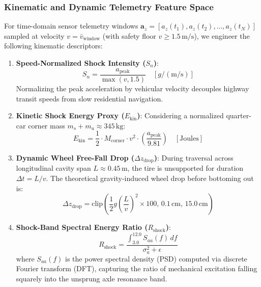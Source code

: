 \subsubsection{Kinematic and Dynamic Telemetry Feature Space}
For time-domain sensor telemetry windows $\mathbf{a}_z = [a_z(t_1), a_z(t_2), \dots, a_z(t_N)]$ sampled at velocity $v = \bar{v}_{\text{window}}$ (with safety floor $v \ge 1.5\,\text{m/s}$), we engineer the following kinematic descriptors:

\begin{enumerate}
    \item \textbf{Speed-Normalized Shock Intensity ($S_n$)}:
    \begin{equation}
        S_n = \frac{a_{\text{peak}}}{\max(v, 1.5)} \quad [g / (\text{m/s})]
    \end{equation}
    Normalizing the peak acceleration by vehicular velocity decouples highway transit speeds from slow residential navigation.
    
    \item \textbf{Kinetic Shock Energy Proxy ($E_{\text{kin}}$)}:
    Considering a normalized quarter-car corner mass $m_s + m_u \approx 345\,\text{kg}$:
    \begin{equation}
        E_{\text{kin}} = \frac{1}{2} \cdot M_{\text{corner}} \cdot v^2 \cdot \left(\frac{a_{\text{peak}}}{9.81}\right) \quad [\text{Joules}]
    \end{equation}
    
    \item \textbf{Dynamic Wheel Free-Fall Drop ($\Delta z_{\text{drop}}$)}:
    During traversal across longitudinal cavity span $L \approx 0.45\,\text{m}$, the tire is unsupported for duration $\Delta t = L / v$. The theoretical gravity-induced wheel drop before bottoming out is:
    \begin{equation}
        \Delta z_{\text{drop}} = \text{clip}\left( \frac{1}{2} g \left(\frac{L}{v}\right)^2 \times 100, \, 0.1\,\text{cm}, \, 15.0\,\text{cm} \right)
    \end{equation}
    
    \item \textbf{Shock-Band Spectral Energy Ratio ($R_{\text{shock}}$)}:
    \begin{equation}
        R_{\text{shock}} = \frac{\int_{3.0}^{12.0} S_{aa}(f) \, df}{\sigma_a^2 + \epsilon}
    \end{equation}
    where $S_{aa}(f)$ is the power spectral density (PSD) computed via discrete Fourier transform (DFT), capturing the ratio of mechanical excitation falling squarely into the unsprung axle resonance band.
    

\end{enumerate}
